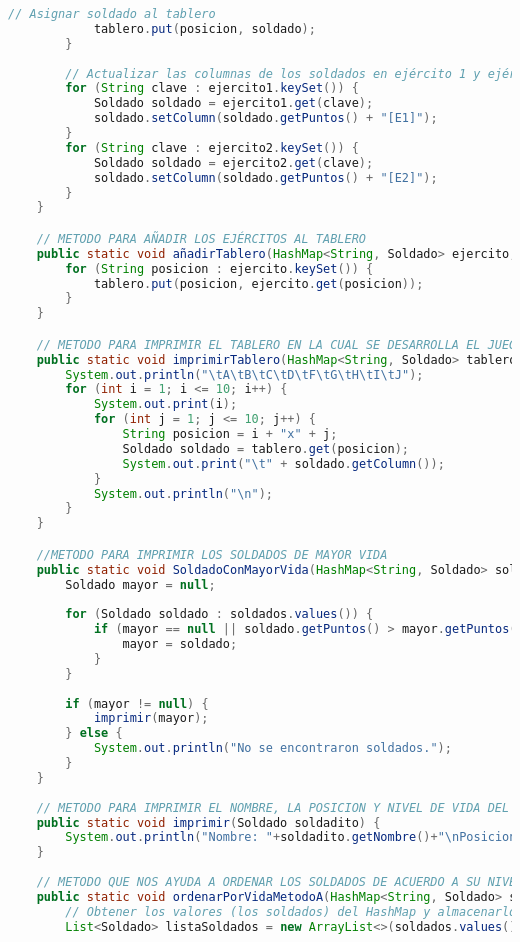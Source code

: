 \documentclass{article}
\begin{document}
\begin{itemize}
\begin{itemize}
\begin{lstlisting}[language=java]
            // Asignar soldado al tablero
            tablero.put(posicion, soldado);
        }
        
        // Actualizar las columnas de los soldados en ejército 1 y ejército 2
        for (String clave : ejercito1.keySet()) {
            Soldado soldado = ejercito1.get(clave);
            soldado.setColumn(soldado.getPuntos() + "[E1]");
        }
        for (String clave : ejercito2.keySet()) {
            Soldado soldado = ejercito2.get(clave);
            soldado.setColumn(soldado.getPuntos() + "[E2]");
        }
    }

    // METODO PARA AÑADIR LOS EJÉRCITOS AL TABLERO
    public static void añadirTablero(HashMap<String, Soldado> ejercito, HashMap<String, Soldado> tablero) {
        for (String posicion : ejercito.keySet()) {
            tablero.put(posicion, ejercito.get(posicion));
        }
    }

    // METODO PARA IMPRIMIR EL TABLERO EN LA CUAL SE DESARROLLA EL JUEGO
    public static void imprimirTablero(HashMap<String, Soldado> tablero) {
        System.out.println("\tA\tB\tC\tD\tF\tG\tH\tI\tJ");
        for (int i = 1; i <= 10; i++) {
            System.out.print(i);
            for (int j = 1; j <= 10; j++) {
                String posicion = i + "x" + j;
                Soldado soldado = tablero.get(posicion);
                System.out.print("\t" + soldado.getColumn());
            }
            System.out.println("\n");
        }
    }

    //METODO PARA IMPRIMIR LOS SOLDADOS DE MAYOR VIDA
	public static void SoldadoConMayorVida(HashMap<String, Soldado> soldados) {
        Soldado mayor = null;
    
        for (Soldado soldado : soldados.values()) {
            if (mayor == null || soldado.getPuntos() > mayor.getPuntos()) {
                mayor = soldado;
            }
        }
    
        if (mayor != null) {
            imprimir(mayor);
        } else {
            System.out.println("No se encontraron soldados.");
        }
    }
	
	// METODO PARA IMPRIMIR EL NOMBRE, LA POSICION Y NIVEL DE VIDA DEL SOLDADO
	public static void imprimir(Soldado soldadito) {
		System.out.println("Nombre: "+soldadito.getNombre()+"\nPosicion: "+soldadito.getColumna()+"X"+soldadito.getFila()+"\tVida: "+soldadito.getPuntos());
	}
	
	// METODO QUE NOS AYUDA A ORDENAR LOS SOLDADOS DE ACUERDO A SU NIVEL DE VIDA, USUANDO UN ALGORITMO DE ORDENAMIENTO DE BURBUJA
	public static void ordenarPorVidaMetodoA(HashMap<String, Soldado> soldados) {
        // Obtener los valores (los soldados) del HashMap y almacenarlos en una lista
        List<Soldado> listaSoldados = new ArrayList<>(soldados.values());
    

\end{lstlisting}
\end{itemize}
\end{itemize}
\end{document}
